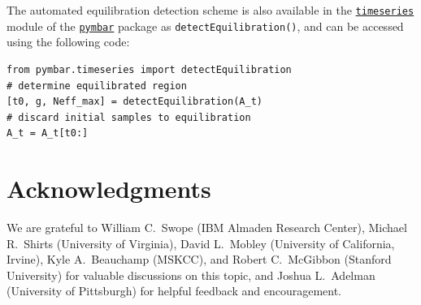 \documentclass[aps,pre,twocolumn,nofootinbib,superscriptaddress,linenumbers,11point]{revtex4-1}
\begin{document}
The automated equilibration detection scheme is also available in the \href{http://pymbar.readthedocs.org/en/latest/timeseries.html}{\tt timeseries} module of the \href{http://github.com/choderalab/pymbar}{\tt pymbar} package as {\tt detectEquilibration()}, and can be accessed using the following code:

\begin{verbatim}
from pymbar.timeseries import detectEquilibration
# determine equilibrated region
[t0, g, Neff_max] = detectEquilibration(A_t)
# discard initial samples to equilibration
A_t = A_t[t0:]
\end{verbatim}


\section*{Acknowledgments}

We are grateful to William C.~Swope (IBM Almaden Research Center), Michael R.~Shirts (University of Virginia), David L.~Mobley (University of California, Irvine), Kyle A.~Beauchamp (MSKCC), and Robert C.~McGibbon (Stanford University) for valuable discussions on this topic, and Joshua L.~Adelman (University of Pittsburgh) for helpful feedback and encouragement.


 

\end{document}
